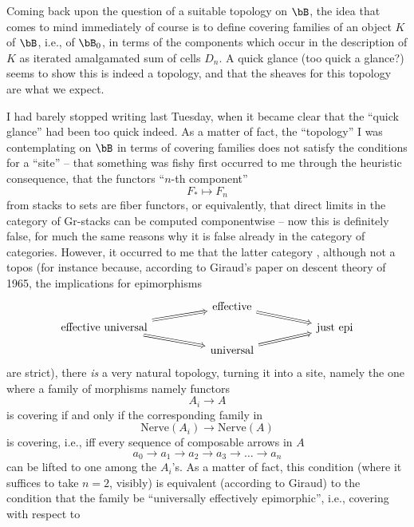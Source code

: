 Coming back upon the question of a suitable topology on $\bB$, the
idea that comes to mind immediately of course is to define covering
families of an object $K$ of $\bB$, i.e., of $\bB_0$, in terms
of the components which occur in the description of $K$ as iterated
amalgamated sum of cells $D_n$. A quick glance (too quick a glance?)
seems to show this is indeed a topology, and that the sheaves for this
topology are what we expect.

\bigbreak

\presectionfill{}\par

\label{sec:20}%
I had barely stopped writing last Tuesday, when it became clear that
the ``quick glance'' had been too quick indeed. As a matter of fact,
the ``topology'' I was contemplating on $\bB$ in terms of covering
families does not satisfy the conditions for a ``site'' -- that
something was fishy first occurred to me through the heuristic
consequence, that the functors ``$n$-th component''
\[F_* \mapsto F_n\]
from stacks to sets are fiber functors, or equivalently, that direct
limits in the category of Gr-stacks can be computed componentwise --
now this is definitely false, for much the same reasons why it is
false already in the category \Cat{} of categories. However, it
occurred to me that the latter category \Cat{}, although not a topos
(for instance because, according to Giraud's paper on descent theory
of 1965, the implications for epimorphisms
\[
\begin{tikzcd}[row sep=tiny,column sep=huge,arrows=Rightarrow]
  & \text{effective} \ar[dr] & \\
  \text{effective universal} \ar[ur] \ar[dr] & & \text{just epi} \\
  & \text{universal} \ar[ur]
\end{tikzcd}
\]
are strict), there \emph{is} a very natural topology, turning it into
a site, namely the one where a family of morphisms namely functors
\[ A_i \to A\]
is covering if and only if the corresponding family in \Sssets
\[ \text{Nerve}(A_i) \to \text{Nerve}(A)\]
is covering, i.e., if{f} every sequence of composable arrows in $A$
\[ a_0 \to a_1 \to a_2 \to a_3 \to \dots \to a_n\]
can be lifted to one among the $A_i$'s. As a matter of fact, this
condition (where it suffices to take $n=2$, visibly) is equivalent
(according to Giraud) to the condition that the family be
``universally effectively epimorphic'', i.e., covering with respect to
